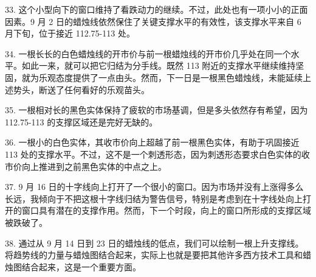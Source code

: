 33. 这个小型向下的窗口维持了看跌动力的继续。不过，此处也有一项小小的正面因素。9 月 2 日的蜡烛线依然保住了关键支撑水平的有效性，该支撑水平来自 6 月下旬，位于接近 112.75-113 处。

34. 一根长长的白色蜡烛线的开市价与前一根蜡烛线的开市价几乎处在同一个水平。如此一来，就可以把它归结为分手线。既然 113 附近的支撑水平继续维持坚固，就为乐观态度提供了一点由头。然而，下一日是一根黑色蜡烛线，未能延续上述势头，断送了任何看好的乐观苗头。

35. 一根相对长的黑色实体保持了疲软的市场基调，但是多头依然存有希望，因为 112.75-113 的支撑区域还是完好无缺的。

36. 一根小的白色实体，其收市价向上超越了前一根黑色实体，有助于巩固接近 113 处的支撑水平。不过，这不是一个刺透形态，因为刺透形态要求白色实体的收市价向上推进到之前黑色实体的中点之上。

37. 9 月 16 日的十字线向上打开了一个很小的窗口。因为市场并没有上涨得多么长远，我倾向于不把这根十字线归结为警告信号，特别是考虑到在十字线处向上打开的窗口具有潜在的支撑作用。然而，下一个时段，向上的窗口所形成的支撑区域被跌破了。

38. 通过从 9 月 14 日到 23 日的蜡烛线的低点，我们可以绘制一根上升支撑线。将趋势线的力量与蜡烛图结合起来，实际上也就是要把其他许多西方技术工具和蜡烛图结合起来，这是一个重要方面。

